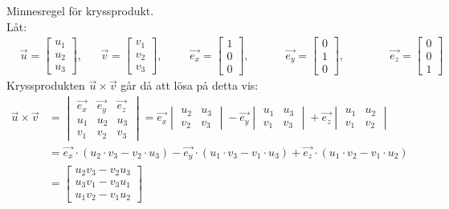\begin{Ex}
    Minnesregel för kryssprodukt.\\
    Låt:
    \begin{align*}
    &\vec{u} = \begin{bmatrix} u_1\\u_2\\u_3 \end{bmatrix}, 
    &&\vec{v} = \begin{bmatrix} v_1\\v_2\\v_3 \end{bmatrix}, 
    &&&\vec{e_x} = \begin{bmatrix} 1\\0\\0 \end{bmatrix}, 
    &&&&\vec{e_y} = \begin{bmatrix} 0\\1\\0 \end{bmatrix}, 
    &&&&&\vec{e_z} = \begin{bmatrix} 0\\0\\1 \end{bmatrix}
    \end{align*}
    Kryssprodukten $\vec{u} \times \vec{v}$ går då att lösa på detta vis:
    \begin{align*}
    \vec{u} \times \vec{v} &= \begin{vmatrix} \vec{e_x}&\vec{e_y}&\vec{e_z}\\u_1&u_2&u_3\\v_1&v_2&v_3 \end{vmatrix} = \vec{e_x} \begin{vmatrix} u_2&u_3\\v_2&v_3 \end{vmatrix} - \vec{e_y} \begin{vmatrix} u_1&u_3\\v_1&v_3 \end{vmatrix} + \vec{e_z} \begin{vmatrix} u_1&u_2\\v_1&v_2 \end{vmatrix}\\
    &= \vec{e_x} \cdot (u_2 \cdot v_3 - v_2 \cdot u_3) - \vec{e_y} \cdot (u_1 \cdot v_3 - v_1 \cdot u_3) + \vec{e_z} \cdot (u_1 \cdot v_2 - v_1 \cdot u_2)\\
    &= \begin{bmatrix} u_2v_3 - v_2u_3\\u_3v_1 - v_3u_1\\u_1v_2 - v_1u_2 \end{bmatrix}
    \end{align*}
\end{Ex}
\newpage
